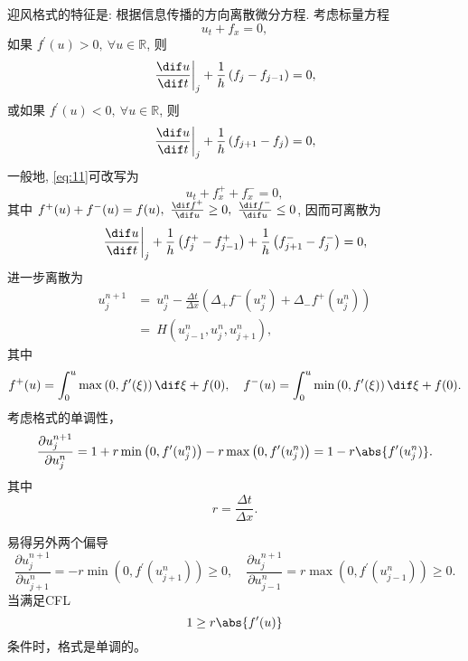 \documentclass[12pt]{article}
\begin{document}
迎风格式的特征是: 根据信息传播的方向离散微分方程. 考虑标量方程
\begin{equation}
	u_{t}+f_{x}=0,
	\label{eq:11}
\end{equation}
如果 $f^{\prime}(u)>0,\ \forall u \in \mathbb{R}$, 则
\begin{equation}
	\left.\frac{\dif u}{\dif t}\right|_{j}+\frac{1}{h}\left(f_{j}-f_{j-1}\right)=0,
\end{equation}
或如果 $f^{\prime}(u)<0,\ \forall u \in \mathbb{R}$, 则
\begin{equation}
	\left.\frac{\dif u}{\dif t}\right|_{j}+\frac{1}{h}\left(f_{j+1}-f_{j}\right)=0,
\end{equation}
一般地, \cref{eq:11}可改写为
\begin{equation}
	u_{t}+f_{x}^{+}+f_{x}^{-}=0,
\end{equation}
其中 $f^{+}(u)+f^{-}(u)=f(u),\ \frac{\dif f^{+}}{\dif u} \geq 0,\ \frac{\dif f^{-}}{\dif u} \leq 0$, 因而可离散为
\begin{equation}
	\left.\frac{\dif u}{\dif t}\right|_{j}+\frac{1}{h}\left(f_{j}^{+}-f_{j-1}^{+}\right)+\frac{1}{h}\left(f_{j+1}^{-}-f_{j}^{-}\right)=0,
\end{equation}
进一步离散为
\begin{align}
	u_{j}^{n+1} & = \ u_{j}^{n}-\frac{\Delta t}{\Delta x}\left(\Delta_{+} f^{-}\left(u_{j}^{n}\right)+\Delta_{-} f^{+}\left(u_{j}^{n}\right)\right) \\
	            & =\ H(u^n_{j-1},u^n_{j},u^n_{j+1}),
	\label{eq:13}
\end{align}
其中
\begin{equation}
	f^{+}(u)=\int_{0}^{u} \max \left(0, f^{\prime}(\xi)\right) \dif \xi+f(0), \quad f^{-}(u)=\int_{0}^{u} \min \left(0, f^{\prime}(\xi)\right) \dif \xi+f(0).
\end{equation}
考虑格式的单调性，
\begin{equation}
	\frac{\partial u^{n+1}_j}{\partial u^{n}_j} = 1 + r\min \left(0, f^{\prime}(u^{n}_j)\right) - r\max \left(0, f^{\prime}(u^{n}_j)\right) = 1 - r\abs{f^{\prime}(u^{n}_j)}.
\end{equation}
其中
\begin{equation}
	r = \frac{\Delta t}{\Delta x}.
\end{equation}

易得另外两个偏导
\begin{equation}
	\frac{\partial u^{n+1}_j}{\partial u^{n}_{j+1}} = - r\min \left(0, f^{\prime}(u^{n}_{j+1})\right) \geq 0,\quad \frac{\partial u^{n+1}_j}{\partial u^{n}_{j-1}} =  r\max \left(0, f^{\prime}(u^{n}_{j-1})\right) \geq 0.
\end{equation}
当满足CFL
\begin{equation}
	1 \geq r\abs{f^{\prime}(u)}
	\label{eq:12cfl}
\end{equation}
条件时，格式是单调的。
\end{document}
